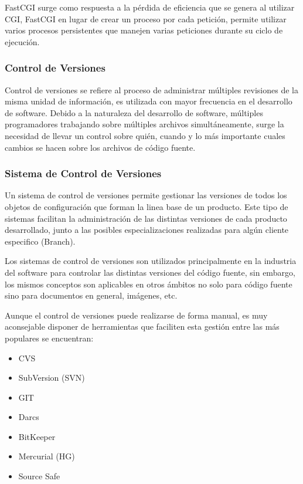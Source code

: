 FastCGI surge como respuesta a la pérdida de eficiencia que se genera al utilizar CGI, FastCGI en lugar de crear un proceso por cada petición, permite utilizar varios procesos persistentes que manejen varias peticiones durante su ciclo de ejecución.


\subsubsection*{Control de Versiones}

Control de versiones se refiere al proceso de administrar múltiples revisiones de la misma unidad de información, es utilizada con mayor frecuencia en el desarrollo de software.
Debido a la naturaleza del desarrollo de software, múltiples programadores trabajando sobre múltiples archivos simultáneamente, surge la necesidad de llevar un control sobre quién, cuando y lo más importante cuales cambios se hacen sobre los archivos de código fuente.


\subsubsection*{Sistema de Control de Versiones}

Un sistema de control de versiones permite gestionar las versiones de todos los objetos de configuración que forman la linea base de un producto. Este tipo de sistemas facilitan la administración de las distintas versiones de cada producto desarrollado, junto a las posibles especializaciones realizadas para algún cliente especifico (Branch).

Los sistemas de control de versiones son utilizados principalmente en la industria del software para controlar las distintas versiones del código fuente, sin embargo, los mismos conceptos son aplicables en otros ámbitos no solo para código fuente sino para documentos en general, imágenes, etc.

Aunque el control de versiones puede realizarse de forma manual, es muy aconsejable disponer de herramientas que faciliten esta gestión entre las más populares se encuentran:

\begin{itemize}

	\item CVS \cite{cvs}
	\item SubVersion (SVN) \cite{svn}
	\item GIT \cite{git}
	\item Darcs \cite{darcs}
	\item BitKeeper \cite{bitkeeper}
	\item Mercurial (HG) \cite{mercurial}
	\item Source Safe \cite{ssafe}

\end{itemize}


